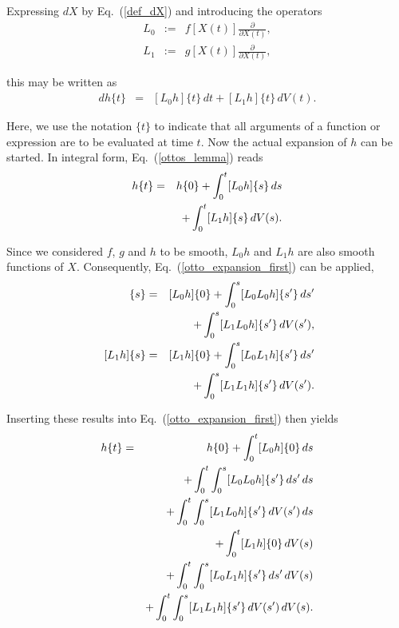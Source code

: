 \documentclass[aps,twocolumn,superscriptaddress,showpacs,showkeys]{revtex4}
\newcommand{\p}{\partial}
\begin{document}
\noindent Expressing $dX$ by Eq.~(\ref{def_dX}) and introducing the operators
%
\begin{subequations}\label{def_L0L1}
\begin{eqnarray}
L_0 &:=& f[X(t)]\frac{\p}{\p X(t)},\\
L_1 &:=& g[X(t)]\frac{\p}{\p X(t)},
\end{eqnarray}
\end{subequations}

\noindent this may be written as
%
\begin{eqnarray}\label{ottos_lemma}
dh\{t\} &=& [L_0 h]\{t\}\,dt +[L_1 h]\{t\}\,dV(t).
\end{eqnarray}

\noindent Here, we use the notation $\{t\}$ to indicate that all arguments of a function or expression are to
be evaluated at time $t$. Now the actual expansion of $h$ can be started. In integral form, Eq.~(\ref{ottos_lemma}) reads
%
\begin{eqnarray}\label{otto_expansion_first}
h\{t\} &=& h\{0\}+\int_0^t [L_0 h]\{s\}\,ds\cr
       && +\int_0^t[L_1 h]\{s\}\,dV(s).
\end{eqnarray}

\noindent Since we considered $f$, $g$ and $h$ to be smooth, $L_0 h$ and $L_1 h$ are also smooth functions of $X$.
Consequently, Eq.~(\ref{otto_expansion_first}) can be applied,
%
\begin{eqnarray}
[L_0 h]\{s\} &=& [L_0 h]\{0\}+\int_0^s [L_0L_0 h]\{s'\}\,ds'\cr
             && +\int_0^s[L_1L_0 h]\{s'\}\,dV(s'),\\~
[L_1 h]\{s\} &=& [L_1 h]\{0\}+\int_0^s [L_0L_1 h]\{s'\}\,ds'\cr
             && +\int_0^s[L_1L_1 h]\{s'\}\,dV(s').
\end{eqnarray}

\noindent Inserting these results into Eq.~(\ref{otto_expansion_first}) then yields
%
\begin{eqnarray}\label{otto_expansion_second}
h\{t\} &=& h\{0\}
+\int_0^t[L_0 h]\{0\}\,ds\cr
&& +\int_0^t\int_0^s [L_0L_0 h]\{s'\}\,ds'\,ds\cr
&& +\int_0^t\int_0^s[L_1L_0 h]\{s'\}\,dV(s')\,ds\cr
&& +\int_0^t[L_1 h]\{0\}\,dV(s)\cr
&& +\int_0^t\int_0^s [L_0L_1 h]\{s'\}\,ds'\,dV(s)\cr
&& +\int_0^t\int_0^s[L_1L_1 h]\{s'\}\,dV(s')\,dV(s) .
\end{eqnarray}
\end{document}
